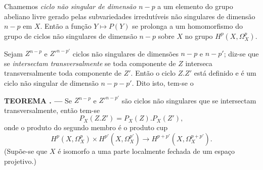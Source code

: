 \documentclass[11pt,twoside,openany]{book}
\numberwithin{equation}{section}
\newcommand{\src}[1]{%
  \phantomsection\hypertarget{src:#1}{}%
  \marginpar{\raggedleft\footnotesize\sffamily #1}%
}
\theoremstyle{plain}
\theoremstyle{definition}
\theoremstyle{remark}
\newcommand{\result}[2]{%
  \par\medskip\noindent\textbf{#1%
  \if\relax\detokenize{#2}\relax\else\space#2\fi. ---}\enspace
}
\newcommand{\FgaUnitKey}{frontmatter}
\renewcommand{\src}[1]{%
  \phantomsection\hypertarget{src:\FgaUnitKey:#1}{}%
  \marginpar{\raggedleft\footnotesize\sffamily #1}%
}
\begin{document}
Chamemos \emph{ciclo não singular de dimensão $n-p$} a um elemento do grupo
abeliano livre gerado pelas subvariedades irredutíveis não singulares de
dimensão $n-p$ em $X$. Então a função $Y\longmapsto P(Y)$ se prolonga a
um homomorfismo do grupo de ciclos não singulares de dimensão $n-p$ sobre $X$
no grupo $H^{p}(X,\Omega_X^{p})$.

Sejam $Z^{n-p}$ e $Z'^{n-p'}$ ciclos não singulares de dimensões $n-p$ e
$n-p'$; diz-se que se \emph{intersectam transversalmente} se toda componente
de $Z$ interseca transversalmente toda componente de $Z'$. Então o ciclo $Z.Z'$ está
definido e é um ciclo não singular de dimensão $n-p-p'$. Dito isto, tem-se o

\src{179}
\result{TEOREMA}{1} Se $Z^{n-p}$ e $Z'^{n-p'}$ são ciclos não singulares
que se intersectam transversalmente, então tem-se
\begin{equation}\tag{4.4}
  P_X(Z.Z')=P_X(Z).P_X(Z'),
\end{equation}
onde o produto do segundo membro é o produto cup
\[
  H^{p}(X,\Omega_X^{p})\times H^{p'}(X,\Omega_X^{p'})
  \longrightarrow H^{p+p'}(X,\Omega_X^{p+p'}).
\]
(Supõe-se que $X$ é isomorfo a uma parte localmente fechada de um espaço
projetivo.)
\end{document}
